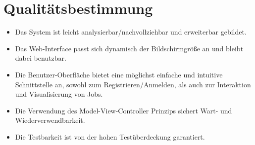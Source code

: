 \section{Qualitätsbestimmung}
\begin{itemize}    
    \item Das System ist leicht analysierbar/nachvollziehbar und erweiterbar gebildet.
    \item Das Web-Interface passt sich dynamisch der Bildschirmgröße an und bleibt dabei benutzbar.
    \item Die Benutzer-Oberfläche bietet eine möglichst einfache und intuitive Schnittstelle an, sowohl zum Registrieren/Anmelden, als auch zur Interaktion und Visualisierung von Jobs.
    \item Die Verwendung des Model-View-Controller Prinzips sichert Wart- und Wiederverwendbarkeit.
    \item Die Testbarkeit ist von der hohen Testüberdeckung garantiert.
\end{itemize}